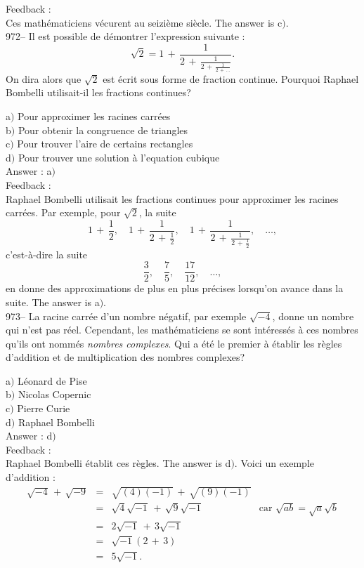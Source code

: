 \documentclass[letterpaper, 12pt]{article}
\begin{document}
Feedback : \\
Ces math\'ematiciens v\'ecurent au seizi\`eme si\`ecle. The answer is
c$)$.\\

972-- Il est possible de d\'emontrer l'expression suivante :
$$\sqrt2=1\,+\,\frac1{2\,+\,\frac1{2\,+\,\frac1{2\,+\,\ldots}}}.$$
On dira alors que $\sqrt2$ est \'ecrit sous forme de fraction
continue. Pourquoi Raphael Bombelli utilisait-il les fractions
continues?

a$)$ Pour approximer les racines carr\'ees \\
b$)$ Pour obtenir la congruence de triangles \\
c$)$ Pour trouver l'aire de certains rectangles  \\
d$)$ Pour trouver une solution \`a l'equation cubique \\

Answer : a$)$\\

Feedback : \\
Raphael Bombelli utilisait les fractions continues pour approximer
les racines carr\'ees. Par exemple, pour $\sqrt2$, la suite
$$1\,+\,\frac12,\quad1\,+\,\frac1{2\,+\,\frac12},\quad1\,+\,\frac1{2\,+\,\frac1{2\,+\,\frac12}},\quad\ldots,$$
c'est-\`a-dire la suite
$$\displaystyle\frac32,\quad\displaystyle\frac75,\quad\displaystyle\frac{17}{12},\quad\ldots,$$
en donne des approximations de plus en plus pr\'ecises lorsqu'on avance dans
la suite. The answer is a$)$.\\

973-- La racine carr\'ee d'un nombre n\'egatif, par exemple
$\sqrt{-4}$, donne un nombre qui n'est pas r\'eel. Cependant, les
math\'ematiciens se sont int\'eress\'es \`a ces nombres qu'ils ont
nomm\'es {\sl nombres complexes}. Qui a \'et\'e le premier \`a
\'etablir les r\`egles d'addition et de multiplication des nombres
complexes?

a$)$ L\'eonard de Pise \\
b$)$ Nicolas Copernic \\
c$)$ Pierre Curie  \\
d$)$ Raphael Bombelli \\

Answer : d$)$\\

Feedback :\\
Raphael Bombelli \'etablit ces r\`egles. The answer is d$)$.
Voici un exemple d'addition :
$$\begin{array}{rcll}
\sqrt{-4}\,+\,\sqrt{-9} & = & \sqrt{(4)(-1)}\,+\,\sqrt{(9)(-1)}   & \\
[3mm]
                    & = & \sqrt4\sqrt{-1}\,+\,\sqrt9\sqrt{-1} & \text{car }
\sqrt{ab}=\sqrt a\sqrt b \\ [3mm]
                    & = & 2\sqrt{-1}\,+\,3\sqrt{-1}           & \\ [3mm]
                    & = & \sqrt{-1}(2\,+\,3)                  & \\ [3mm]
                    & = & 5\sqrt{-1}.
\end{array}$$
\\
\end{document}
